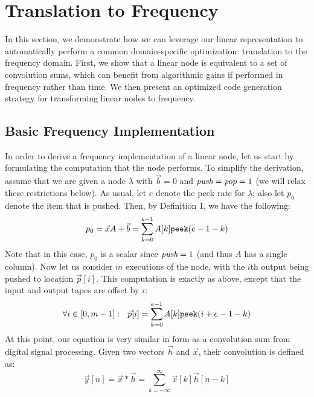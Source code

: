 \section{Translation to Frequency}
\label{sec:freq}

In this section, we demonstrate how we can leverage our linear
representation to automatically perform a common domain-specific
optimization: translation to the frequency domain.  First, we show
that a linear node is equivalent to a set of convolution sums, which
can benefit from algorithmic gains if performed in frequency rather
than time.  We then present an optimized code generation strategy for
transforming linear nodes to frequency.

\subsection{Basic Frequency Implementation}

In order to derive a frequency implementation of a linear node, let us
start by formulating the computation that the node performs.  To
simplify the derivation, assume that we are given a node $\lambda$
with $\vec{b} = 0$ and $\mbox{\it push}=\mbox{\it pop}=1$ (we will relax these
restrictions below).  As usual, let $e$ denote the peek rate for
$\lambda$; also let $p_0$ denote the item that is pushed.  Then, by
Definition 1, we have the following:
\begin{equation}
  p_0 = \vec{x} A + {\vec b} = \sum_{k=0}^{e-1} A[k] \mbox{\tt peek}(e-1-k)
\end{equation}
Note that in this case, $p_0$ is a scalar since $\mbox{\it push}=1$ (and
thus $A$ has a single column).  Now let us consider $m$ executions of
the node, with the $i$th output being pushed to location ${\vec
p}[i]$.  This computation is exactly as above, except that the input
and output tapes are offset by $i$:
\begin{equation}
  \protect\label{eq:linconv}
  \forall i \in [0, m-1]:~~\vec{p}[i] = \sum_{k=0}^{e-1} A[k] \mbox{\tt peek}(i+e-1-k)
\end{equation}
At this point, our equation is very similar in form as a convolution
sum from digital signal processing.  Given two vectors $\vec{h}$ and
$\vec{x}$, their convolution is defined as:
\begin{equation}
  {\vec y}[n] = \vec{x} * \vec{h} = \sum_{k=-\infty}^{\infty} \vec{x}[k] \vec{h}[n-k]
\end{equation}


